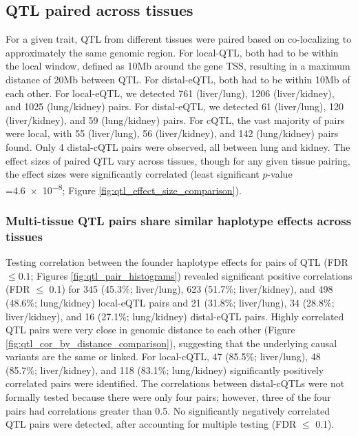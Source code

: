 \documentclass[9pt,twocolumn,twoside]{gsajnl}
\begin{document}

\subsection{QTL paired across tissues}

For a given trait, QTL from different tissues were paired based on co-localizing to approximately the same genomic region. For local-QTL, both had to be within the local window, defined as 10Mb around the gene TSS, resulting in a maximum distance of 20Mb between QTL. For distal-eQTL, both had to be within 10Mb of each other. 
For local-eQTL, we detected 761 (liver/lung), 1206 (liver/kidney), and 1025 (lung/kidney) pairs. For distal-eQTL, we detected 61 (liver/lung), 120 (liver/kidney), and 59 (lung/kidney) pairs. For cQTL, the vast majority of pairs were local, with 55 (liver/lung), 56 (liver/kidney), and 142 (lung/kidney) pairs found. Only 4 distal-cQTL pairs were observed, all between lung and kidney. The effect sizes of paired QTL vary across tissues, though for any given tissue pairing, the effect sizes were significantly correlated (least significant $p$-value =\num{4.6e-8}; Figure \ref{fig:qtl_effect_size_comparison}).

\subsubsection{Multi-tissue QTL pairs share similar haplotype effects across tissues}
Testing correlation between the founder haplotype effects for pairs of QTL (FDR $\le 0.1$; Figures \ref{fig:qtl_pair_histograms}) revealed significant positive correlations (FDR $\leq$ 0.1) for 345 (45.3\%; liver/lung), 623 (51.7\%; liver/kidney), and 498 (48.6\%; lung/kidney) local-eQTL pairs and 21 (31.8\%; liver/lung), 34 (28.8\%; liver/kidney), and 16 (27.1\%; lung/kidney) distal-eQTL pairs. Highly correlated QTL pairs were very close in genomic distance to each other (Figure \ref{fig:qtl_cor_by_distance_comparison}), suggesting that the underlying causal variants are the same or linked. For local-cQTL, 47 (85.5\%; liver/lung), 48 (85.7\%; liver/kidney), and 118 (83.1\%; lung/kidney) significantly positively correlated pairs were identified. The correlations between distal-cQTLs were not formally tested because there were only four pairs; however, three of the four pairs had correlations greater than 0.5. No significantly negatively correlated QTL pairs were detected, after accounting for multiple testing (FDR $\leq$ 0.1).
\end{document}
